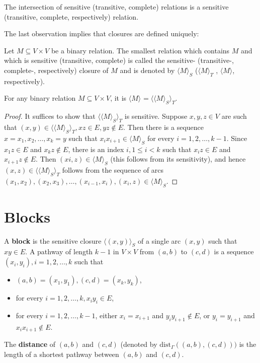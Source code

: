 \begin{observ}
	The intersection of sensitive (transitive, complete) relations is a sensitive (transitive, complete, respectively) relation.
\end{observ}

The last observation implies that closures are defined uniquely:

\begin{defn}
	Let $M \subseteq V \times V$ be a binary relation. The smallest relation which contains $M$ and which is sensitive (transitive, complete) is called the sensitive- (transitive-, complete-, respectively) closure of $M$ and is denoted by $\langle M \rangle_{S}$ ($\langle M \rangle_{T}$ , $\langle M \rangle$, respectively).
\end{defn}

\begin{lemma}
	For any binary relation $M \subseteq V \times V$, it is $\langle M \rangle_{} = \langle\langle M \rangle_{S}\rangle_{T}$.
	\label{lemma-1}
\end{lemma}

\begin{proof}
	It suffices to show that $\langle\langle M \rangle_{S}\rangle_{T}$ is sensitive. Suppose $x, y, z \in V$ are such that $(x, y) \in \langle\langle M \rangle_{S}\rangle_{T}, xz \in E, yz \notin E$. Then there is a sequence $x = x_1 , x_2 , \dots, x_k = y$ such that $x_i x_{i+1} \in \langle M \rangle_{S}$ for every $i = 1, 2, \dots, k-1$. Since $x_1 z \in E$ and $x_k z \notin E$, there is an index $i, 1 \leq i < k$ such that $x_i z \in E$ and $x_{i+1} z \notin E$. Then $(xi , z) \in \langle M \rangle_S$ (this follows from its sensitivity), and hence $(x, z) \in \langle\langle M \rangle_{S}\rangle_{T}$	follows from the sequence of arcs $(x_1 , x_2), (x_2 , x_3), \dots, (x_{i-1} , x_i), (x_i , z) \in \langle M \rangle_{S}$.
\end{proof}

\section{Blocks}

\begin{defn}
	A \textbf{block} is the sensitive closure $\langle(x, y)\rangle_S$ of a single arc $(x, y)$ such that $xy \in E$. A pathway of length $k - 1$ in $V \times V$ from $(a, b)$ to $(c, d)$ is a sequence $(x_i, y_i), i = 1, 2, \dots, k$ such that
	
	\begin{itemize}
		\item $(a,b) = (x_1, y_1), (c,d) = (x_k, y_k)$,
		\item for every $i = 1, 2, \dots, k, x_i y_i \in E$,
		\item for every $i = 1, 2, \dots, k - 1$, either $x_i = x_{i+1}$ and $y_i y_{i+1} \notin E$, or $y_i = y_{i+1}$ and $x_i x_{i+1} \notin E$.
	\end{itemize}
	
	The \textbf{distance} of $(a, b)$ and $(c, d)$ (denoted by $\text{dist}_\Gamma ((a, b), (c, d)))$ is the length of a shortest pathway	between $(a, b)$ and $(c, d)$.
\end{defn}

